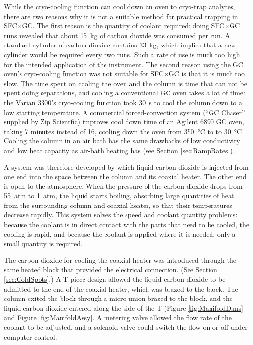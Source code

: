 While the cryo-cooling function can cool down an oven to cryo-trap analytes,
there are two reasons why it is not a suitable method for practical trapping in
SFC×GC. The first reason is the quantity of coolant required: doing SFC×GC runs
revealed that about \SI{15}{\kilogram} of carbon dioxide was consumed per run. A
standard cylinder of carbon dioxide contains \SI{33}{\kilogram}, which implies
that a new cylinder would be required every two runs. Such a rate of use is much
too high for the intended application of the instrument. The second reason using
the GC oven's cryo-cooling function was not suitable for SFC×GC is that it is
much too slow. The time spent on cooling the oven and the column is time that
can not be spent doing separations, and cooling a conventional GC oven takes a
lot of time: the Varian 3300's cryo-cooling function took \SI{30}{\second} to
cool the column down to a low starting temperature. A commercial
forced-convection system (``GC Chaser'' supplied by Zip Scientfic) improves cool
down time of an Agilent 6890 GC oven, taking 7 minutes instead of 16, cooling
down the oven from \SI{350}{\celsius} to to \SI{30}{\celsius} Cooling the
column in an air bath has the same drawbacks of low conductivity and low heat
capacity as air-bath heating has (see Section \ref{sec:RampRates}).

A system was therefore developed by which liquid carbon dioxide is injected from
one end into the space between the column and its coaxial heater. The other end
is open to the atmosphere. When the pressure of the carbon dioxide drops from
\SI{55}{atm} to \SI{1}{atm}, the liquid starts boiling, absorbing large
quantities of heat from the surrounding column and coaxial heater, so that their
temperatures decrease rapidly. This system solves the speed and coolant quantity
problems: because the coolant is in direct contact with the parts that need to
be cooled, the cooling is rapid, and because the coolant is applied where it is
needed, only a small quantity is required.

The carbon dioxide for cooling the coaxial heater was introduced through the
same heated block that provided the electrical connection. (See Section
\ref{sec:ColdSpots}.) A T-piece design allowed the liquid carbon dioxide to be
admitted to the end of the coaxial heater, which was brazed to the block. The
column exited the block through a micro-union brazed to the block, and the
liquid carbon dioxide entered along the side of the T (Figure
\ref{fig:ManifoldDims} and Figure \ref{fig:ManifoldAssy}.  A metering valve
allowed the flow rate of the coolant to be adjusted, and a solenoid valve could
switch the flow on or off under computer control.

